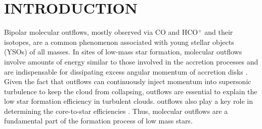 \section{INTRODUCTION}
Bipolar molecular outflows, mostly observed via CO and HCO$^+$ and their isotopes, are a common phenomenon associated with young stellar objects (YSOs) of all masses\citep{ 1985ARA&A..23..267L,1993prpl.conf..603F, 2001ApJ...552L.167Z,2002A&A...383..892B, 2004A&A...426..503W, 2005AJ....129..330W, 2006A&A...453..785F, 2007prpl.conf..245A, 2015MNRAS.453..645M}. In sites of low-mass star formation, molecular outflows involve amounts of energy similar to those involved in the accretion processes and are indispensable for dissipating excess angular momentum of accretion disks \citep{1987ARA&A..25...23S, 1996ARA&A..34..111B}. Given the fact that outflows can continuously inject momentum into supersonic turbulence to keep the cloud from collapsing, outflows are essential to explain the low star formation efficiency in turbulent clouds. outflows also play a key role in determining the core-to-star efficiencies \citep{2014prpl.conf..451F}. Thus, molecular outflows are a fundamental part of the formation process of low mass stars. 

